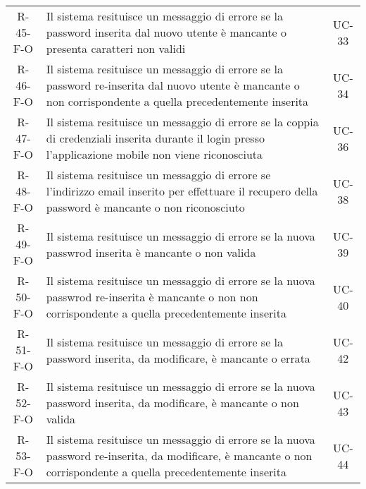 \begin{longtable}{ c C{9.5cm} c }
    R-45-F-O & Il sistema resituisce un messaggio di errore se la password inserita dal nuovo utente è mancante o presenta caratteri non validi& UC-33\\
    R-46-F-O & Il sistema resituisce un messaggio di errore se la password re-inserita dal nuovo utente è mancante o non corrispondente a quella precedentemente inserita& UC-34\\
    R-47-F-O & Il sistema resituisce un messaggio di errore se la coppia di credenziali inserita durante il login presso l'applicazione mobile non viene riconosciuta& UC-36\\
    R-48-F-O & Il sistema resituisce un messaggio di errore se l'indirizzo email inserito per effettuare il recupero della password è mancante o non riconosciuto& UC-38\\
    R-49-F-O & Il sistema resituisce un messaggio di errore se la nuova passwrod inserita è mancante o non valida& UC-39\\
    R-50-F-O & Il sistema resituisce un messaggio di errore se la nuova passwrod re-inserita è mancante o non non corrispondente a quella precedentemente inserita& UC-40\\
    R-51-F-O & Il sistema resituisce un messaggio di errore se la password inserita, da modificare, è mancante o errata& UC-42\\
    R-52-F-O & Il sistema resituisce un messaggio di errore se la nuova password inserita, da modificare, è mancante o non valida& UC-43\\
    R-53-F-O & Il sistema resituisce un messaggio di errore se la nuova password re-inserita, da modificare, è mancante o non corrispondente a quella precedentemente inserita& UC-44\\

\end{longtable}